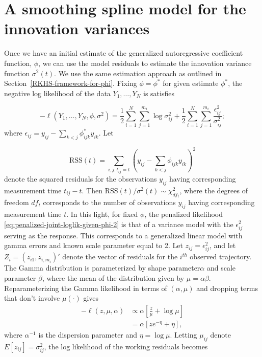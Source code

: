 \section{A smoothing spline model for the innovation variances}
%

Once we have an initial estimate of the generalized autoregressive coefficient function, $\phi$, we can use the model residuals to estimate the innovation variance function $\sigma^2\left(t\right)$. We use the same estimation approach as outlined in Section~\ref{RKHS-framework-for-phi}. Fixing $\phi = \phi^*$ for given estimate $\phi^*$, the negative log likelihood of the data $Y_1,\dots, Y_N$ is satisfies

\begin{equation} \label{eq:penalized-joint-loglik-given-phi-2}
-\ell\left( Y_1,\dots, Y_N, \phi, \sigma^2 \right) =  \frac{1}{2}\sum_{i = 1}^N \sum_{j = 1}^{m_i} \log \sigma^2_{ij}  + \frac{1}{2}\sum_{i = 1}^N \sum_{j = 1}^{m_i} \frac {\epsilon_{ij}^2}{\sigma^2_{ij}};
\end{equation}
\noindent
where $\epsilon_{ij} =  y_{ij} - \sum_{k<j} \phi^*_{ijk} y_{ik}$. Let 

\begin{equation}
\mbox{RSS}\left( t \right) = \sum_{i,j:t_{ij}= t} \left( y_{ij} - \sum_{k<j} \phi_{ijk} y_{ik}\right)^2
\end{equation}
\noindent
denote the squared residuals for the observations $y_{ij}$ having corresponding measurement time $t_{ij} - t$. Then $\mbox{RSS}\left( t \right)/\sigma^2\left(t\right) \sim \chi^2_{df_t}$, where the degrees of freedom $df_{t}$ corresponds to the number of observations $y_{ij}$ having corresponding measurement time $t$. In this light, for fixed $\phi$, the penalized likelihood \ref{eq:penalized-joint-loglik-given-phi-2} is that of a variance model with the $\epsilon_{ij}^2$ serving as the response.  This corresponds to a generalized linear model with gamma errors and known scale parameter equal to 2. Let $z_{ij} = \epsilon_{ij}^2$, and let $Z_{i} = \left(z_{i1},z_{i,m_i} \right)'$ denote the vector of residuals for the $i^{th}$ observed trajectory. The Gamma distribution is parameterized by shape parameter$\alpha$ and scale parameter $\beta$, where the mean of the distribution given by $\mu = \alpha \beta$. Reparameterizing the Gamma likelihood in terms of $\left(\alpha, \mu \right)$ and dropping terms that don't involve $\mu\left(\cdot\right)$ gives  
\begin{align}
-\ell\left(z,\mu, \alpha \right) &\propto \alpha\left[\frac{z}{\mu} + \log \mu\right]  \label{eq:gamma-iv-likelihood} \\ 
&= \alpha\left[ze^{-\eta} + \eta\right],\label{eq:gamma-iv-likelihood-canonical-link}
\end{align}
\noindent
where $\alpha^{-1}$ is the dispersion parameter and $\eta = \log \mu$. Letting $\mu_{ij}$ denote $E\left[ z_{ij} \right] = \sigma_{ij}^2$, the log likelihood of the working residuals becomes 

